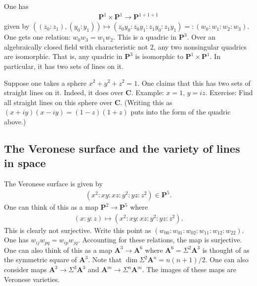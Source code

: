 \documentclass [11 pt, oneside] {article}
\begin{document}
\begin{example}\label{seg}
One has
\begin{align*}
	\mathbf{P}^1\times \mathbf{P}^1\longrightarrow \mathbf{P}^{1+1+1}
\end{align*}
given by $((z_0:z_1), (y_0:y_1)) \longmapsto (z_0y_0:z_0y_1: z_1y_0: z_1y_1) =:(w_0:w_1:w_2:w_3)$. One gets one relation: $w_0w_3=w_1w_2$. This is a quadric in $\mathbf{P}^3$. Over an algebraically closed field with characteristic not $2$, any two nonsingular quadrics are isomorphic. That is, any quadric in $\mathbf{P}^3$ is isomorphic to $\mathbf{P}^1\times \mathbf{P}^1$. In particular, it has two sets of lines on it. 

Suppose one takes a sphere $x^2+y^2+z^2=1$. One claims that this has two sets of straight lines on it. Indeed, it does over $\mathbf{C}$. Example: $x=1$, $y=iz$. Exercise: Find all straight lines on this sphere over $\mathbf{C}$. (Writing this as $(x+iy) (x-iy)= (1-z) (1+z)$ puts into the form of the quadric above.)
\end{example}

\subsection{The Veronese surface and the variety of lines in space}
\begin{example}\label{}
 The Veronese surface is given by
\begin{align*}
	(x^2:xy:xz:y^2:yz:z^2)\in  \mathbf{P}^5.
\end{align*}
One can think of this as a map $\mathbf{P}^2\longrightarrow \mathbf{P}^5$ where
\begin{align*}
	(x:y:z) \longmapsto (x^2:xy:xz:y^2:yz:z^2).	
\end{align*}
This is clearly not surjective. Write this point as $(w_{00}:w_{01}:w_{02}:w_{11}:w_{12}:w_{22})$. One has $w_{ij}w_{pq} = w_{ip}w_{jq}$. Accounting for these relations, the map is surjective. One can also think of this as a map $\mathbf{A}^3\longrightarrow \mathbf{A}^6$ where $\mathbf{A}^6 = \Sigma^2\mathbf{A}^3$ is thought of as the symmetric square of $\mathbf{A}^3$. Note that $\dim \Sigma^2\mathbf{A}^n = n(n+1)/2$. One can also consider maps $\mathbf{A}^3\longrightarrow \Sigma^3 \mathbf{A}^3$ and $\mathbf{A}^m \longrightarrow \Sigma^n \mathbf{A}^m$. The images of these maps are Veronese varieties.
\end{example}
\end{document}

